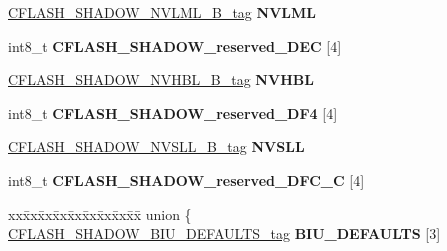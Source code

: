 \begin{DoxyCompactItemize}
\begin{tabbing}
\end{tabbing}\item 
\mbox{\label{structCFLASH__SHADOW__struct__tag_a00489104ca0243b1aee512a355c6e86f}} 
\mbox{\hyperlink{unionCFLASH__SHADOW__NVLML__32B__tag}{C\+F\+L\+A\+S\+H\+\_\+\+S\+H\+A\+D\+O\+W\+\_\+\+N\+V\+L\+M\+L\+\_\+B\+\_\+tag}} {\bfseries N\+V\+L\+ML}
\item 
\mbox{\label{structCFLASH__SHADOW__struct__tag_a424ed81d6bfbc519c2c784c51f3c4afe}} 
int8\+\_\+t {\bfseries C\+F\+L\+A\+S\+H\+\_\+\+S\+H\+A\+D\+O\+W\+\_\+reserved\+\_\+D\+EC} \mbox{[}4\mbox{]}
\item 
\mbox{\label{structCFLASH__SHADOW__struct__tag_a4a27016e41ec256ed1e9e754e5f97234}} 
\mbox{\hyperlink{unionCFLASH__SHADOW__NVHBL__32B__tag}{C\+F\+L\+A\+S\+H\+\_\+\+S\+H\+A\+D\+O\+W\+\_\+\+N\+V\+H\+B\+L\+\_\+B\+\_\+tag}} {\bfseries N\+V\+H\+BL}
\item 
\mbox{\label{structCFLASH__SHADOW__struct__tag_adf54547f048b22c56e8fcd79581d4ff9}} 
int8\+\_\+t {\bfseries C\+F\+L\+A\+S\+H\+\_\+\+S\+H\+A\+D\+O\+W\+\_\+reserved\+\_\+D\+F4} \mbox{[}4\mbox{]}
\item 
\mbox{\label{structCFLASH__SHADOW__struct__tag_a3b0ed8aab73793e3cd066f6f58743927}} 
\mbox{\hyperlink{unionCFLASH__SHADOW__NVSLL__32B__tag}{C\+F\+L\+A\+S\+H\+\_\+\+S\+H\+A\+D\+O\+W\+\_\+\+N\+V\+S\+L\+L\+\_\+B\+\_\+tag}} {\bfseries N\+V\+S\+LL}
\item 
\mbox{\label{structCFLASH__SHADOW__struct__tag_a26a1e574093ce1e6ded4b0b3dcfdc66d}} 
int8\+\_\+t {\bfseries C\+F\+L\+A\+S\+H\+\_\+\+S\+H\+A\+D\+O\+W\+\_\+reserved\+\_\+D\+F\+C\+\_\+C} \mbox{[}4\mbox{]}
\item 
\mbox{\label{structCFLASH__SHADOW__struct__tag_a40de4b7998c5e9e807324a5c64e049ee}} 
\begin{tabbing}
xx\=xx\=xx\=xx\=xx\=xx\=xx\=xx\=xx\=\kill
union \{\\
\>\mbox{\hyperlink{structCFLASH__SHADOW__BIU__DEFAULTS__struct__tag}{CFLASH\_SHADOW\_BIU\_DEFAULTS\_tag}} {\bfseries BIU\_DEFAULTS} \mbox{[}3\mbox{]}\\

\end{tabbing}
\end{DoxyCompactItemize}
